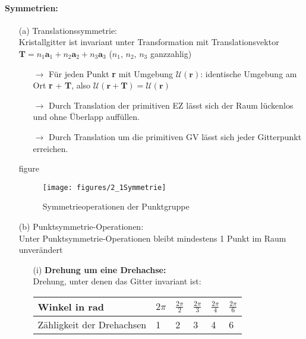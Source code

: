 \paragraph{Symmetrien:}
\begin{itemize}
    \item[(a)] Translationssymmetrie:\\
          Kristallgitter ist invariant unter Transformation mit Translationsvektor $\textbf{T} = n_1 \textbf{a}_1 + n_2 \textbf{a}_2 +n_3 \textbf{a}_3$ ($n_1$, $n_2$, $n_3$ ganzzahlig)
          \begin{itemize}
              \item[$\rightarrow$] Für jeden Punkt \textbf{r} mit Umgebung $\mathcal{U} (\textbf{r})$: identische Umgebung am Ort \textbf{r} + \textbf{T}, also $\mathcal{U} (\textbf{r} + \textbf{T}) = \mathcal{U} (\textbf{r})$
              \item[$\rightarrow$] Durch Translation der primitiven EZ lässt sich der Raum lückenlos und ohne Überlapp auffüllen.
              \item[$\rightarrow$] Durch Translation um die primitiven GV lässt sich jeder Gitterpunkt erreichen.
          \end{itemize}
          {figure}\begin{figure}[H]
            \centering
            \texttt{[image: figures/2\_1Symmetrie]}
            \caption{Symmetrieoperationen der Punktgruppe}
            \label{}
        \end{figure}
    \item[(b)] Punktsymmetrie-Operationen:\\
          Unter Punktsymmetrie-Operationen bleibt mindestens 1 Punkt im Raum unverändert
          \begin{itemize}
              \item[(i)] \textbf{Drehung um eine Drehachse:}\\
                    Drehung, unter denen das Gitter invariant ist:
                    \begin{table}[H]
                        \centering
                        \begin{tabular}{l|lllll}
                            Winkel in rad             & $2 \pi$ & $\frac{2\pi}{2}$ & $\frac{2\pi}{3}$ & $\frac{2\pi}{4}$ & $\frac{2\pi}{6}$ \\\hline
                            Zähligkeit der Drehachsen & 1       & 2                & 3                & 4                & 6
                        \end{tabular}

\end{table}
\end{itemize}
\end{itemize}
